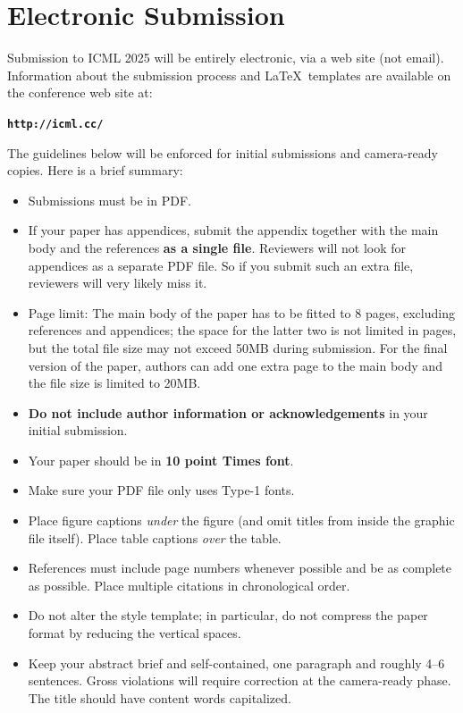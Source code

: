 \documentclass{article}
\theoremstyle{plain}
\theoremstyle{definition}
\theoremstyle{remark}
\begin{document}
\section{Electronic Submission}
\label{submission}

Submission to ICML 2025 will be entirely electronic, via a web site
(not email). Information about the submission process and \LaTeX\ templates
are available on the conference web site at:
\begin{center}
\textbf{\texttt{http://icml.cc/}}
\end{center}

The guidelines below will be enforced for initial submissions and
camera-ready copies. Here is a brief summary:
\begin{itemize}
\item Submissions must be in PDF\@. 
\item If your paper has appendices, submit the appendix together with the main body and the references \textbf{as a single file}. Reviewers will not look for appendices as a separate PDF file. So if you submit such an extra file, reviewers will very likely miss it.
\item Page limit: The main body of the paper has to be fitted to 8 pages, excluding references and appendices; the space for the latter two is not limited in pages, but the total file size may not exceed 50MB during submission. For the final version of the paper, authors can add one extra page to the main body and the file size is limited to 20MB.
\item \textbf{Do not include author information or acknowledgements} in your
    initial submission.
\item Your paper should be in \textbf{10 point Times font}.
\item Make sure your PDF file only uses Type-1 fonts.
\item Place figure captions \emph{under} the figure (and omit titles from inside
    the graphic file itself). Place table captions \emph{over} the table.
\item References must include page numbers whenever possible and be as complete
    as possible. Place multiple citations in chronological order.
\item Do not alter the style template; in particular, do not compress the paper
    format by reducing the vertical spaces.
\item Keep your abstract brief and self-contained, one paragraph and roughly
    4--6 sentences. Gross violations will require correction at the
    camera-ready phase. The title should have content words capitalized.
\end{itemize}
\end{document}
